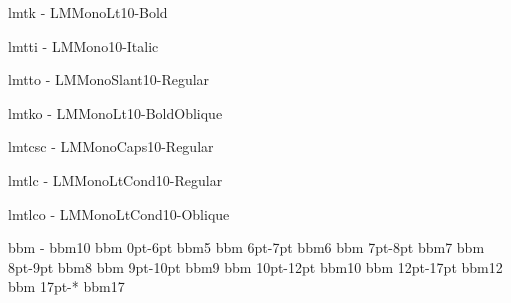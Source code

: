 \registertfm lmtk       -      LMMonoLt10-Bold\LMfeat{}

\registertfm lmtti      -      LMMono10-Italic\LMfeat{}

\registertfm lmtto      -      LMMonoSlant10-Regular\LMfeat{}

\registertfm lmtko      -      LMMonoLt10-BoldOblique\LMfeat{}

\registertfm lmtcsc     -      LMMonoCaps10-Regular\LMfeat{}

\newfam\ttfam
\loadmathfam{}



\registertfm lmtlc      -      LMMonoLtCond10-Regular\LMfeat{}

\registertfm lmtlco     -      LMMonoLtCond10-Oblique\LMfeat{}




\registertfm bbm     -      bbm10
\registertfm bbm  0pt-6pt   bbm5
\registertfm bbm  6pt-7pt   bbm6
\registertfm bbm  7pt-8pt   bbm7
\registertfm bbm  8pt-9pt   bbm8
\registertfm bbm  9pt-10pt  bbm9
\registertfm bbm  10pt-12pt bbm10
\registertfm bbm  12pt-17pt bbm12
\registertfm bbm  17pt-*    bbm17


\newfam\bbfam
\def\bb{\fam\bbfam}

\def\loadbbm{%
	\loadmathfam\bbfam[/bbm]%
}
\loadbbm


\def\setbaselines#1{%
	\dimen0=1pt
	\dimen0=#1\dimen0
	\normalbaselineskip=1.2\dimen0
	\normallineskip=0.1\dimen0
	\setbox\strutbox=\hbox{\vrule height 0.85\dimen0 depth 0.35\dimen0 width 0pt}%
	\topskip=1\dimen0
	\normalbaselines
}

\def\settextsize#1{%
	\def\fomenc{CM}%
	\setfonts[/#1]%
	\setmath[//]%
	\setbaselines{#1}%
	\loadbbm
}
\def\twelvepoint{\settextsize{12}}


\def\tt{\ifmmode\fam\ttfam\else\setfonts[LMMono/]\fi}

\let\footfont=\tenrm
